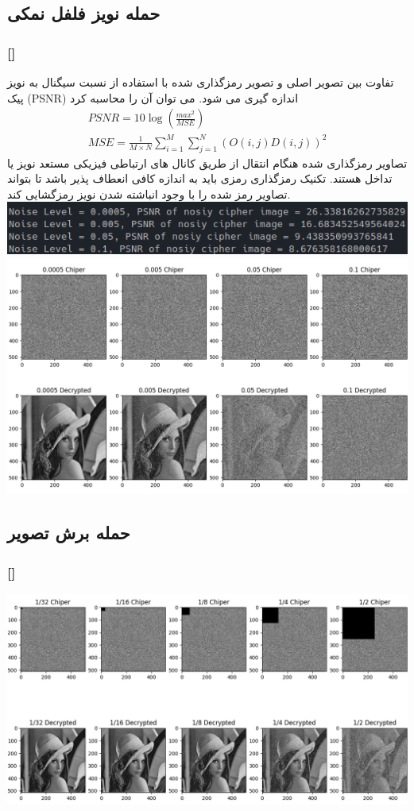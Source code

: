 \documentclass[xcolor=dvipsnames, professionalfonts, 11pt]{beamer}
\newcommand*{\makeframetitle}{\frametitle{\insertsection \hspace{0.1em} {\footnotesize [\insertsubsection]}}}
\begin{document}
\subsection{حمله نویز فلفل نمکی}
\begin{frame}[allowframebreaks]
    \makeframetitle
    \vfill
    تفاوت بین تصویر اصلی و تصویر رمزگذاری شده با استفاده از نسبت سیگنال به نویز پیک (PSNR) اندازه گیری می شود. می توان آن را محاسبه کرد
    \begin{align}
        PSNR = 10 \log\left( \frac{max^2}{MSE} \right)\\
        MSE = \frac{1}{M \times N}\sum_{i=1}^{M}\sum_{j=1}^{N}(O(i, j)  D(i, j))^2
    \end{align}
    \vfill
    \framebreak
    تصاویر رمزگذاری شده هنگام انتقال از طریق کانال های ارتباطی فیزیکی مستعد نویز یا تداخل هستند.
    تکنیک رمزگذاری رمزی باید به اندازه کافی انعطاف پذیر باشد تا بتواند تصاویر رمز شده را با وجود انباشته شدن نویز رمزگشایی کند.
    \includegraphics[width=\textwidth]{assets/result13.png}
    \includegraphics[width=\textwidth]{assets/result12.png}
\end{frame}

\subsection{حمله برش تصویر}
\begin{frame}
    \makeframetitle
    \includegraphics[width=\textwidth]{assets/result14.png}
\end{frame}
\end{document}
